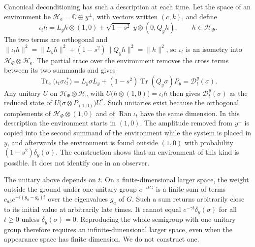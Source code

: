 \documentclass[11pt]{article}
\theoremstyle{definition}
\DeclareMathOperator{\Ran}{Ran}
\DeclareMathOperator{\Tr}{Tr}
\newcommand{\C}{\mathbb C}
\begin{document}
Canonical deconditioning has such a description at each time. Let the space of an environment be $\mathcal H_{\mathrm e}=\C\oplus y^\perp$, with vectors written $(c,k)$, and define
\begin{equation}
 \iota_th=L_yh\otimes(1,0)+\sqrt{1-s^2}\;y\otimes(0,Q_yh),\qquad h\in\mathcal H_\Phi .
 \label{eq:relaxation-dilation}
\end{equation}
The two terms are orthogonal and $\|\iota_th\|^2=\|L_yh\|^2+(1-s^2)\|Q_yh\|^2=\|h\|^2$, so $\iota_t$ is an isometry into $\mathcal H_\Phi\otimes\mathcal H_{\mathrm e}$. The partial trace over the environment removes the cross terms between its two summands and gives
\begin{equation}
 \Tr_{\mathrm e}\bigl(\iota_t\sigma\iota_t^*\bigr)=L_y\sigma L_y+(1-s^2)\Tr(Q_y\sigma)P_y=\mathcal D_t^y(\sigma).
 \label{eq:relaxation-dilation-trace}
\end{equation}
Any unitary $U$ on $\mathcal H_\Phi\otimes\mathcal H_{\mathrm e}$ with $U\bigl(h\otimes(1,0)\bigr)=\iota_th$ then gives $\mathcal D_t^y(\sigma)$ as the reduced state of $U\bigl(\sigma\otimes P_{(1,0)}\bigr)U^*$. Such unitaries exist because the orthogonal complements of $\mathcal H_\Phi\otimes(1,0)$ and of $\Ran\iota_t$ have the same dimension. In this description the environment starts in $(1,0)$. The amplitude removed from $y^\perp$ is copied into the second summand of the environment while the system is placed in $y$, and afterwards the environment is found outside $(1,0)$ with probability $(1-s^2)\delta_y(\sigma)$. The construction shows that an environment of this kind is possible. It does not identify one in an observer.

The unitary above depends on $t$. On a finite-dimensional larger space, the weight outside the ground under one unitary group $e^{-itG}$ is a finite sum of terms $c_{ab}e^{-i(g_a-g_b)t}$ over the eigenvalues $g_a$ of $G$. Such a sum returns arbitrarily close to its initial value at arbitrarily late times. It cannot equal $e^{-\gamma t}\delta_y(\sigma)$ for all $t\ge0$ unless $\delta_y(\sigma)=0$. Reproducing the whole semigroup with one unitary group therefore requires an infinite-dimensional larger space, even when the appearance space has finite dimension. We do not construct one.
\end{document}
